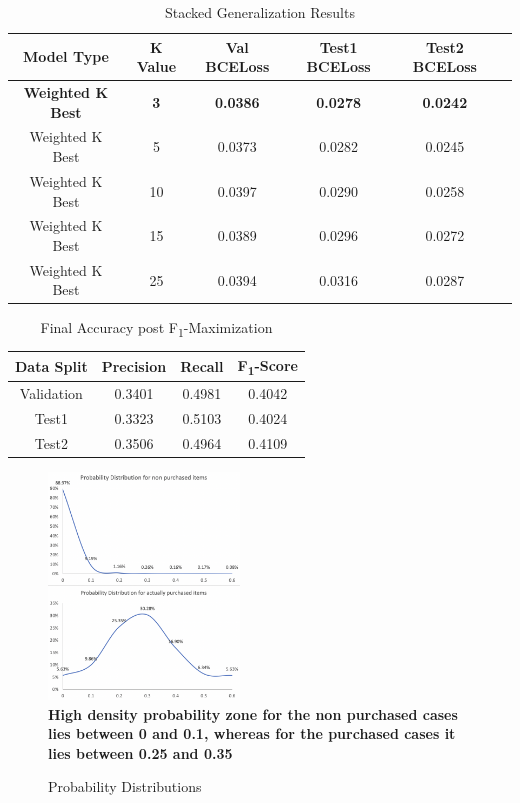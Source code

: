 \begin{table}[t]
\caption{ Stacked Generalization Results}
\vspace{0.1 in}
\centering
\resizebox{3.3in}{!}
{%
\begin{tabular}{|c|c|c|c|c|c|}
\hline
{\bf Model Type} & {\bf K Value} & {\bf Val BCELoss} & {\bf Test1 BCELoss} & {\bf Test2 BCELoss} \\ 
\hline\hline 
{\bf Weighted K Best}	  &  {\bf 3}  &  {\bf 0.0386} &  {\bf 0.0278} &  {\bf 0.0242}  \\ \hline
Weighted K Best	  		&  5  &  0.0373 &  0.0282 &  0.0245  \\ \hline
Weighted K Best	  		 &  10 &  0.0397 &  0.0290 &  0.0258  \\ \hline
Weighted K Best	  		 &  15 &  0.0389 &  0.0296 &  0.0272  \\ \hline
Weighted K Best	  		&  25  &  0.0394 &  0.0316 &  0.0287  \\ \hline
\end{tabular}
}
\label{tab:stacking}
\end{table}

\begin{table}[hbt!]
\caption{Final Accuracy post F\textsubscript{1}-Maximization}
\vspace{0.1 in}
\centering
\resizebox{2.5in}{!}
{%
\begin{tabular}{|c|c|c|c|}
\hline
{\bf Data Split} & {\bf Precision} & {\bf Recall} & {\bf F\textsubscript{1}-Score} \\ 
\hline\hline 
Validation	  	 &  0.3401 &  0.4981 &  0.4042  \\ \hline
Test1	  		 &  0.3323 &  0.5103 &  0.4024  \\ \hline
Test2	  		 & 0.3506 &  0.4964 &  0.4109 \\ \hline
\end{tabular}
}
\label{tab:Fscore}
\end{table}

  \begin{figure}[hbt!]
    \centering 
    \caption{Probability Distributions} 
    \includegraphics[width=2in]{img/density.png} 
    \\ {\scriptsize \bf High density probability zone for the non purchased cases lies between 0 and 
    0.1, whereas for the purchased cases it lies between 0.25 and 0.35}
    \label{fig:probdensity} 
  \end{figure}
